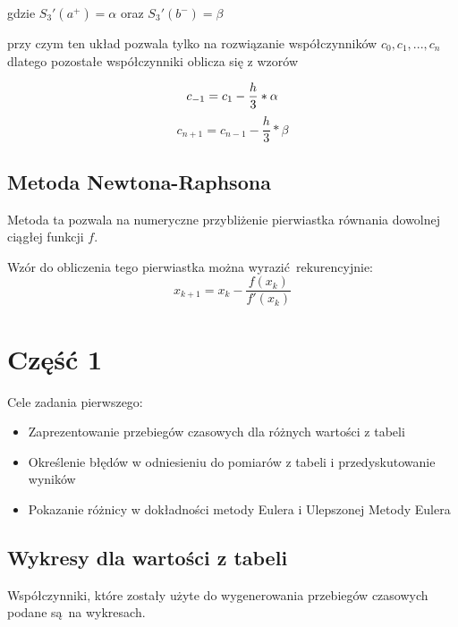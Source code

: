 \documentclass[varwidth,12pt,a4paper]{article}
\begin{document}
gdzie $S_3'(a^+) = \alpha $ oraz $S_3'(b^-) = \beta$

przy czym ten układ pozwala tylko na rozwiązanie współczynników $c_0, c_1,...,c_n$
dlatego pozostałe współczynniki oblicza się z wzorów

\begin{equation}
    c_{-1} = c_1  - \frac{h}{3} * \alpha \\
\end{equation}
\begin{equation}
    c_{n+1} = c_{n-1}  - \frac{h}{3} * \beta 
\end{equation}



\subsection{Metoda Newtona-Raphsona}

Metoda ta pozwala na numeryczne przybliżenie pierwiastka równania dowolnej ciągłej funkcji $f$.

Wzór do obliczenia tego pierwiastka można wyrazić rekurencyjnie:
\begin{equation}
    x_{k+1} = x_k - \frac{f(x_k)}{f'(x_k)}
\end{equation}

\section{Część 1}

Cele zadania pierwszego:

\begin{itemize}
  \item Zaprezentowanie przebiegów czasowych dla różnych wartości z tabeli
  \item Określenie błędów w odniesieniu do pomiarów z tabeli i przedyskutowanie wyników
  \item Pokazanie różnicy w dokładności metody Eulera i Ulepszonej Metody Eulera
\end{itemize}

\subsection{Wykresy dla wartości z tabeli}

Współczynniki, które zostały użyte do wygenerowania przebiegów czasowych podane są na wykresach.
\end{document}

